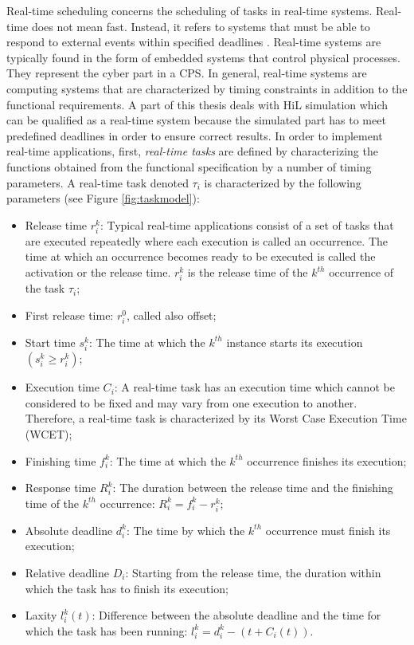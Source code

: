 Real-time scheduling concerns the scheduling of tasks in real-time systems. Real-time does not mean fast. Instead, it refers to systems that must be able to respond to external events within specified deadlines \cite{stankovic:1988}. Real-time systems are typically found in the form of embedded systems that control physical processes. They represent the cyber part in a CPS. In general, real-time systems are computing systems that are characterized by timing constraints in addition to the functional requirements. A part of this thesis deals with HiL simulation which can be qualified as a real-time system because the simulated part has to meet predefined deadlines in order to ensure correct results.
In order to implement real-time applications, first, \textit{real-time tasks} are defined by characterizing the functions obtained from the functional specification by a number of timing parameters. A real-time task denoted $\tau_i$ is characterized by the following parameters (see Figure \ref{fig:taskmodel}):
\begin{itemize}
\item Release time $r^k_i$: Typical real-time applications consist of a set of tasks that are executed repeatedly where each execution is called an occurrence. The time at which an occurrence becomes ready to be executed is called the activation or the release time. $r^k_i$ is the release time of the $k^{th}$ occurrence of the task $\tau_i$;
\item First release time: $r^0_i$, called also offset;
\item Start time $s^k_i$: The time at which the $k^{th}$ instance starts its execution $(s^k_i \geq r^k_i)$;
\item Execution time $C_i$: A real-time task has an execution time which cannot be considered to be fixed and may vary from one execution to another. Therefore, a real-time task is characterized by its Worst Case Execution Time (WCET);
\item Finishing time $f^k_i$: The time at which the $k^{th}$ occurrence finishes its execution;
\item Response time $R^k_i$: The duration between the release time and the finishing time of the $k^{th}$ occurrence: $R^k_i = f^k_i - r^k_i$;
\item Absolute deadline $d^k_i$: The time by which the $k^{th}$ occurrence must finish its execution;
\item Relative deadline $D_i$: Starting from the release time, the duration within which the task has to finish its execution;
\item Laxity $l^k_i(t)$: Difference between the absolute deadline and the time for which the task has been running: $l^k_i=d^k_i-(t+C_i(t))$.
\end{itemize}

